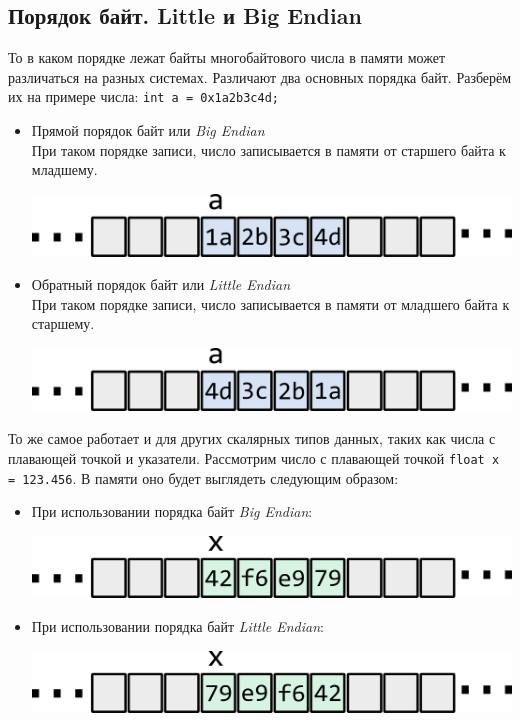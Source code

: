 \documentclass{article}
\begin{document}
\subsection*{Порядок байт. Little и Big Endian}
То в каком порядке лежат байты многобайтового числа в памяти может различаться на разных системах. Различают два основных порядка байт. Разберём их на примере числа: \texttt{int a = 0x1a2b3c4d;}
\begin{itemize}
\item Прямой порядок байт или \textit{Big Endian}\\
При таком порядке записи, число записывается в памяти от старшего байта к младшему. 
\begin{center}
\includegraphics[scale=0.9]{../images/memory/lb_big_int.png}
\end{center}

\item Обратный порядок байт или \textit{Little Endian}\\
При таком порядке записи, число записывается в памяти от младшего байта к старшему. 
\begin{center}
\includegraphics[scale=0.9]{../images/memory/lb_little_int.png}
\end{center}
\end{itemize}
То же самое работает и для других скалярных типов данных, таких как числа с плавающей точкой и указатели. Рассмотрим число с плавающей точкой \texttt{float x = 123.456}. В памяти оно будет выглядеть следующим образом:
\begin{itemize}
\item При использовании порядка байт \textit{Big Endian}:\\
\begin{center}
\includegraphics[scale=0.9]{../images/memory/lb_big_float.png}
\end{center}

\item При использовании порядка байт \textit{Little Endian}:\\
\begin{center}
\includegraphics[scale=0.9]{../images/memory/lb_little_float.png}
\end{center}
\end{itemize}
\end{document}
